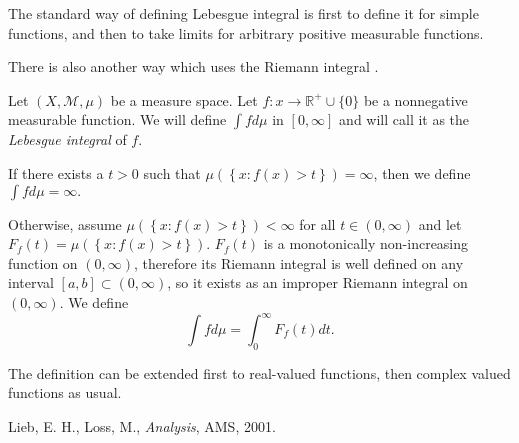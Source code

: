 \documentclass[12pt]{article}
\newcommand{\calg}[1]{\mathcal{#1}}
\begin{document}
The standard way of defining Lebesgue integral is first to define it for  simple functions, and then to take limits for arbitrary positive measurable functions.  

There is also another way which uses the Riemann integral \cite{lieb}.

Let $(X,\calg{M},\mu)$ be a measure space. Let $f\colon x\rightarrow \mathbb{R}^+\cup \{0\}$ be a nonnegative measurable function.  We will define $\int f d\mu$ in $[0,\infty]$ and will call it as the \emph{Lebesgue integral} of $f$.

If there exists a $t>0$ such that $\mu\left(\left\{x\colon f(x)>t \right\}\right)=\infty$, then we define $\int f d\mu = \infty.$

Otherwise, assume $\mu\left(\left\{x\colon f(x)>t \right\}\right)<\infty$ for all $t\in(0,\infty)$ and let $F_f(t) = \mu\left(\left\{x\colon f(x)>t \right\}\right)$.  $F_f(t)$ is a monotonically non-increasing function on $(0,\infty)$, therefore its Riemann integral is well defined on any interval $[a,b]\subset (0,\infty)$, so it exists as an improper Riemann integral on $(0,\infty)$.  We define
$$
\int f d\mu = \int_0^\infty F_f(t) dt.
$$

The definition can be extended first to real-valued functions, then complex valued functions as usual.





\begin{thebibliography}{9}
 Lieb, E. H., Loss, M., \textsl{Analysis},  AMS, 2001.

\end{thebibliography}

\end{document}
